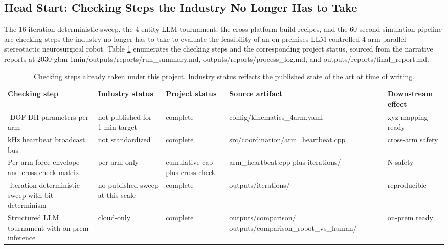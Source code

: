 \subsection{Head Start: Checking Steps the Industry No Longer Has to Take}
\label{sec:discussion-headstart}

The 16-iteration deterministic sweep, the 4-entity LLM tournament,
the cross-platform build recipes, and the 60-second simulation
pipeline are checking steps the industry no longer has to take to
evaluate the feasibility of an on-premises LLM controlled 4-arm
parallel stereotactic neurosurgical robot. Table \ref{tab:headstart}
enumerates the checking steps and the corresponding project status,
sourced from the narrative reports at
2030-gbm-1min/outputs/reports/run_summary.md,
outputs/reports/process_log.md, and outputs/reports/final_report.md.

\clearpage

\begin{table}[H]
\centering
\caption{Checking steps already taken under this project. Industry
status reflects the published state of the art at time of writing.}
\label{tab:headstart}
\begin{tabular}{>{\raggedright\arraybackslash}p{3.1cm}
                >{\raggedright\arraybackslash}p{2.7cm}
                >{\raggedright\arraybackslash}p{2.8cm}
                >{\raggedright\arraybackslash}p{3.3cm}
                >{\raggedright\arraybackslash}p{2.5cm}}
\toprule
\textbf{Checking step} & \textbf{Industry status} & \textbf{Project status} & \textbf{Source artifact} & \textbf{Downstream effect} \\
\midrule
7-DOF DH parameters per arm & not published for 1-min target & complete & config/kinematics_4arm.yaml & xyz mapping ready \\
1 kHz heartbeat broadcast bus & not standardized & complete & src/coordination/arm_heartbeat.cpp & cross-arm safety \\
Per-arm force envelope and cross-check matrix & per-arm only & cumulative cap plus cross-check & arm_heartbeat.cpp plus iterations/ & 12 N safety \\
16-iteration deterministic sweep with bit determinism & no published sweep at this scale & complete & outputs/iterations/ & reproducible \\
Structured LLM tournament with on-prem inference & cloud-only & complete & outputs/comparison/ outputs/comparison_robot_vs_human/ & on-prem ready \\
\bottomrule
\end{tabular}
\end{table}

